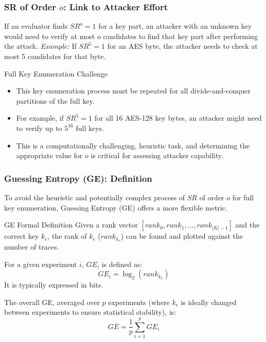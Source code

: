 \begin{frame}
    \frametitle{SR of Order $o$: Link to Attacker Effort}
        If an evaluator finds $SR^o=1$ for a key part, an attacker with an unknown key would need to verify at most $o$ candidates to find that key part after performing the attack.
        \newline
        \textit{Example:} If $SR^5=1$ for an AES byte, the attacker needs to check at most 5 candidates for that byte.
    
    \begin{block}{Full Key Enumeration Challenge}
        \begin{itemize}
            \item This key enumeration process must be repeated for all divide-and-conquer partitions of the full key.
            \item For example, if $SR^5=1$ for all 16 AES-128 key bytes, an attacker might need to verify up to $5^{16}$ full keys.
            \item This is a computationally challenging, heuristic task, and determining the appropriate value for $o$ is critical for assessing attacker capability.
        \end{itemize}
    \end{block}
\end{frame}

\begin{frame}
   
    \frametitle{Guessing Entropy (GE): Definition}
    
        To avoid the heuristic and potentially complex process of $SR$ of order $o$ for full key enumeration, Guessing Entropy (GE) offers a more flexible metric.
   
    
    \begin{block}{GE Formal Definition}
        Given a rank vector $[rank_0, rank_1, \dots, rank_{|K|-1}]$ and the correct key $k_c$, the rank of $k_c$ ($rank_{k_c}$) can be found and plotted against the number of traces.
        
        For a given experiment $i$, $GE_i$ is defined as:
        $$ GE_i = \log_2(rank_{k_c}) $$
        It is typically expressed in bits.
        
        The overall GE, averaged over $p$ experiments (where $k_c$ is ideally changed between experiments to ensure statistical stability), is:
        $$ GE = \frac{1}{p} \sum_{i=1}^{p} GE_i $$
    \end{block}
\end{frame}



